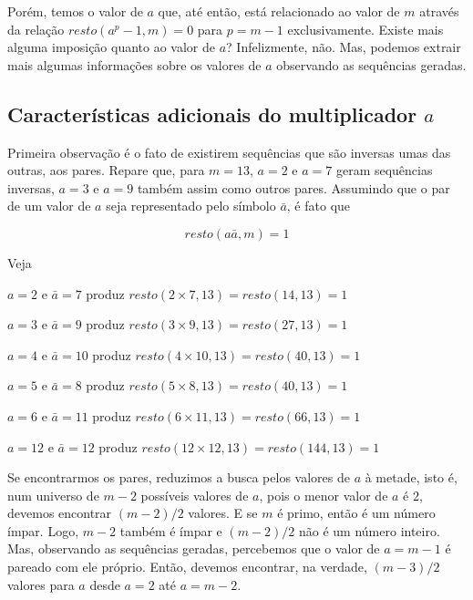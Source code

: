 \documentclass[a4paper,12pt,oneside,onecolumn]{uerj/uerj}
\begin{document}
Porém, temos o valor de $a$ que, até então, está relacionado ao valor de $m$ através da relação $resto(a^{p}-1,m)=0$ para $p=m-1$ exclusivamente. Existe mais alguma imposição quanto ao valor de $a$? Infelizmente, não. Mas, podemos extrair mais algumas informações sobre os valores de $a$ observando as sequências geradas.

\subsection{Características adicionais do multiplicador $a$}

Primeira observação é o fato de existirem sequências que são inversas umas das outras, aos pares. Repare que, para $m=13$, $a=2$ e $a=7$ geram sequências inversas, $a=3$ e $a=9$ também assim como outros pares. Assumindo que o par de um valor de $a$ seja representado pelo símbolo $\bar a$, é fato que

\begin{equation}
resto(a\bar a,m)=1
\end{equation}

Veja

\begin{lcircp}
    \item $a = 2$ e $\bar a = 7$ produz $resto(2\times 7,13)=resto(14,13)=1$
    \item $a = 3$ e $\bar a = 9$ produz $resto(3\times 9,13)=resto(27,13)=1$
    \item $a = 4$ e $\bar a = 10$ produz $resto(4\times 10,13)=resto(40,13)=1$
    \item $a = 5$ e $\bar a = 8$ produz $resto(5\times 8,13)=resto(40,13)=1$
    \item $a = 6$ e $\bar a = 11$ produz $resto(6\times 11,13)=resto(66,13)=1$
    \item $a = 12$ e $\bar a = 12$ produz $resto(12\times 12,13)=resto(144,13)=1$\\
\end{lcircp}

\noindent Se encontrarmos os pares, reduzimos a busca pelos valores de $a$ à metade, isto é, num universo de $m-2$ possíveis valores de $a$, pois o menor valor de $a$ é $2$, devemos encontrar $(m-2)/2$ valores. E se $m$ é primo, então é um número ímpar. Logo, $m-2$ também é ímpar e $(m-2)/2$ não é um número inteiro. Mas, observando as sequências geradas, percebemos que o valor de $a=m-1$ é pareado com ele próprio. Então, devemos encontrar, na verdade, $(m-3)/2$ valores para $a$ desde $a=2$ até $a=m-2$.
\end{document}
